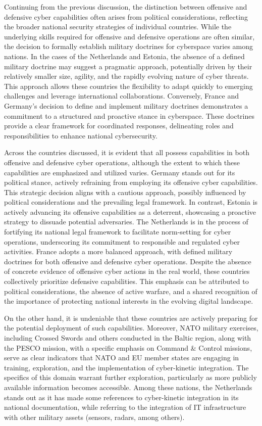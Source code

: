 Continuing from the previous discussion, the distinction between offensive and defensive cyber capabilities often arises from political considerations, reflecting the broader national security strategies of individual countries. While the underlying skills required for offensive and defensive operations are often similar, the decision to formally establish military doctrines for cyberspace varies among nations. In the cases of the Netherlands and Estonia, the absence of a defined military doctrine may suggest a pragmatic approach, potentially driven by their relatively smaller size, agility, and the rapidly evolving nature of cyber threats. This approach allows these countries the flexibility to adapt quickly to emerging challenges and leverage international collaborations. Conversely, France and Germany's decision to define and implement military doctrines demonstrates a commitment to a structured and proactive stance in cyberspace. These doctrines provide a clear framework for coordinated responses, delineating roles and responsibilities to enhance national cybersecurity.

Across the countries discussed, it is evident that all possess capabilities in both offensive and defensive cyber operations, although the extent to which these capabilities are emphasized and utilized varies. Germany stands out for its political stance, actively refraining from employing its offensive cyber capabilities. This strategic decision aligns with a cautious approach, possibly influenced by political considerations and the prevailing legal framework. In contrast, Estonia is actively advancing its offensive capabilities as a deterrent, showcasing a proactive strategy to dissuade potential adversaries. The Netherlands is in the process of fortifying its national legal framework to facilitate norm-setting for cyber operations, underscoring its commitment to responsible and regulated cyber activities. France adopts a more balanced approach, with defined military doctrines for both offensive and defensive cyber operations. Despite the absence of concrete evidence of offensive cyber actions in the real world, these countries collectively prioritize defensive capabilities. This emphasis can be attributed to political considerations, the absence of active warfare, and a shared recognition of the importance of protecting national interests in the evolving digital landscape.

On the other hand, it is undeniable that these countries are actively preparing for the potential deployment of such capabilities. Moreover, NATO military exercises, including Crossed Swords and others conducted in the Baltic region, along with the PESCO mission, with a specific emphasis on Command \& Control missions, serve as clear indicators that NATO and EU member states are engaging in training, exploration, and the implementation of cyber-kinetic integration. The specifics of this domain warrant further exploration, particularly as more publicly available information becomes accessible. Among these nations, the Netherlands stands out as it has made some references to cyber-kinetic integration in its national documentation, while referring to the integration of IT infrastructure with other military assets (sensors, radars, among others).

